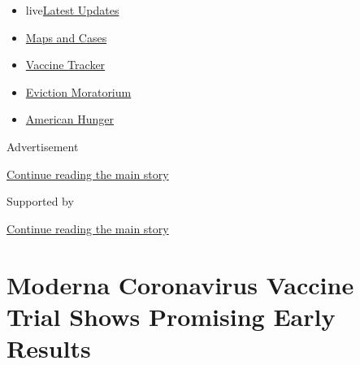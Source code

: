 \begin{itemize}
\tightlist
\item
  live\href{https://www.nytimes3xbfgragh.onion/2020/09/09/world/covid-19-coronavirus.html?name=styln-coronavirus-national\&region=TOP_BANNER\&block=storyline_menu_recirc\&action=click\&pgtype=Article\&impression_id=0e25f611-f291-11ea-834c-e760e465928d\&variant=undefined}{Latest
  Updates}
\item
  \href{https://www.nytimes3xbfgragh.onion/interactive/2020/us/coronavirus-us-cases.html?name=styln-coronavirus-national\&region=TOP_BANNER\&block=storyline_menu_recirc\&action=click\&pgtype=Article\&impression_id=0e261d20-f291-11ea-834c-e760e465928d\&variant=undefined}{Maps
  and Cases}
\item
  \href{https://www.nytimes3xbfgragh.onion/interactive/2020/science/coronavirus-vaccine-tracker.html?name=styln-coronavirus-national\&region=TOP_BANNER\&block=storyline_menu_recirc\&action=click\&pgtype=Article\&impression_id=0e261d21-f291-11ea-834c-e760e465928d\&variant=undefined}{Vaccine
  Tracker}
\item
  \href{https://www.nytimes3xbfgragh.onion/2020/09/02/your-money/eviction-moratorium-covid.html?name=styln-coronavirus-national\&region=TOP_BANNER\&block=storyline_menu_recirc\&action=click\&pgtype=Article\&impression_id=0e261d22-f291-11ea-834c-e760e465928d\&variant=undefined}{Eviction
  Moratorium}
\item
  \href{https://www.nytimes3xbfgragh.onion/interactive/2020/09/02/magazine/food-insecurity-hunger-us.html?name=styln-coronavirus-national\&region=TOP_BANNER\&block=storyline_menu_recirc\&action=click\&pgtype=Article\&impression_id=0e261d23-f291-11ea-834c-e760e465928d\&variant=undefined}{American
  Hunger}
\end{itemize}

Advertisement

\protect\hyperlink{after-top}{Continue reading the main story}

Supported by

\protect\hyperlink{after-sponsor}{Continue reading the main story}

\hypertarget{moderna-coronavirus-vaccine-trial-shows-promising-early-results}{%
\section{Moderna Coronavirus Vaccine Trial Shows Promising Early
Results}\label{moderna-coronavirus-vaccine-trial-shows-promising-early-results}}

